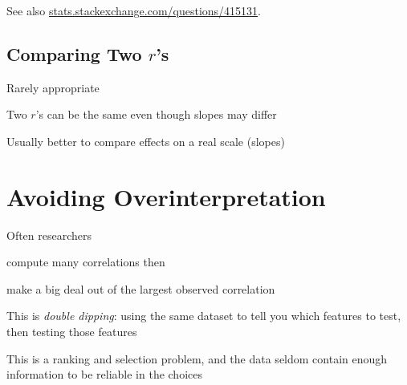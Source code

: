See also \href{https://stats.stackexchange.com/questions/415131}{stats.stackexchange.com/questions/415131}.

\subsection{Comparing Two $r$'s}
\bi
\item Rarely appropriate
\item Two $r$'s can be the same even though slopes may differ
\item Usually better to compare effects on a real scale (slopes)
\ei

\section{Avoiding Overinterpretation}
\bi
\item Often researchers 
 \bi
 \item compute many correlations then
 \item make a big deal out of the largest observed correlation
 \ei
\item This is \emph{double dipping}: using the same dataset to tell you which features to test, then testing those features
\item This is a ranking and selection problem, and the data seldom contain enough information to be reliable in the choices
\ei

